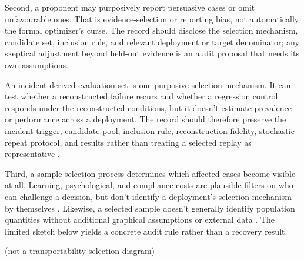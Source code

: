 Second, a proponent may purposively report persuasive cases or omit unfavourable ones. That is evidence-selection or reporting bias, not automatically the formal optimizer's curse. The record should disclose the selection mechanism, candidate set, inclusion rule, and relevant deployment or target denominator; any skeptical adjustment beyond held-out evidence is an audit proposal that needs its own assumptions.

An incident-derived evaluation set is one purposive selection mechanism. It can test whether a reconstructed failure recurs and whether a regression control responds under the reconstructed conditions, but it doesn't estimate prevalence or performance across a deployment. The record should therefore preserve the incident trigger, candidate pool, inclusion rule, reconstruction fidelity, stochastic repeat protocol, and results rather than treating a selected replay as representative \citep{openai2026longHorizonSafety}.

Third, a sample-selection process determines which affected cases become visible at all. Learning, psychological, and compliance costs are plausible filters on who can challenge a decision, but don't identify a deployment's selection mechanism by themselves \citep{moynihanHerdHarvey2015administrativeBurden}. Likewise, a selected sample doesn't generally identify population quantities without additional graphical assumptions or external data \citep{bareinboimTianPearl2014selectionBias}. The limited sketch below yields a concrete audit rule rather than a recovery result.

\begin{center}
 (not a transportability selection diagram)\\[1.5mm]
\centering
{}
\end{center}


